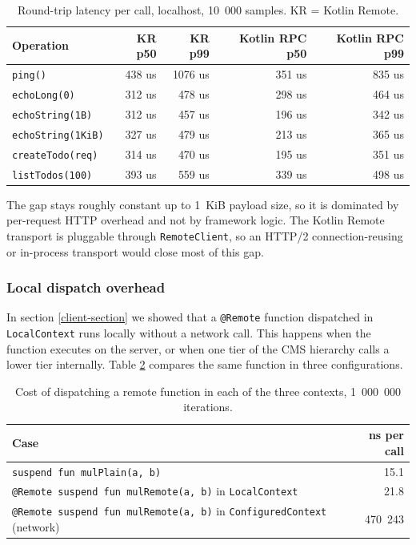 \documentclass[a4paper,11pt,oneside]{article}
\newcommand{\kotlini}[1]{\texttt{#1}}
\begin{document}
\begin{table}[!h]
  \begin{center}
    \begin{tabular}{lrrrr}
      \toprule
      Operation                 & KR p50 & KR p99 & Kotlin RPC p50 & Kotlin RPC p99 \\
      \midrule
      \kotlini{ping()}          & 438 us & 1076 us & 351 us & 835 us \\
      \kotlini{echoLong(0)}     & 312 us &  478 us & 298 us & 464 us \\
      \kotlini{echoString(1B)}  & 312 us &  457 us & 196 us & 342 us \\
      \kotlini{echoString(1KiB)}& 327 us &  479 us & 213 us & 365 us \\
      \kotlini{createTodo(req)} & 314 us &  470 us & 195 us & 351 us \\
      \kotlini{listTodos(100)}  & 393 us &  559 us & 339 us & 498 us \\
      \bottomrule
    \end{tabular}
    \caption{Round-trip latency per call, localhost, 10~000 samples. KR = Kotlin
    Remote.}\label{latency_table}
  \end{center}
\end{table}

The gap stays roughly constant up to 1~KiB payload size, so it is dominated by
per-request HTTP overhead and not by framework logic. The Kotlin Remote transport is
pluggable through \kotlini{RemoteClient}, so an HTTP/2 connection-reusing or in-process
transport would close most of this gap.

\subsubsection{Local dispatch overhead}\label{local_dispatch_section}

In section \ref{client-section} we showed that a \kotlini{@Remote} function dispatched
in \kotlini{LocalContext} runs locally without a network call. This happens when the
function executes on the server, or when one tier of the CMS hierarchy calls a lower
tier internally. Table \ref{local_dispatch_table} compares the same function in three
configurations.

\begin{table}[!h]
  \begin{center}
    \begin{tabular}{lr}
      \toprule
      Case & ns per call \\
      \midrule
      \kotlini{suspend fun mulPlain(a, b)} & 15.1 \\
      \kotlini{@Remote suspend fun mulRemote(a, b)} in \kotlini{LocalContext} & 21.8 \\
      \kotlini{@Remote suspend fun mulRemote(a, b)} in \kotlini{ConfiguredContext} (network) & 470~243 \\
      \bottomrule
    \end{tabular}
    \caption{Cost of dispatching a remote function in each of the three contexts,
    1~000~000 iterations.}\label{local_dispatch_table}
  \end{center}
\end{table}
\end{document}
